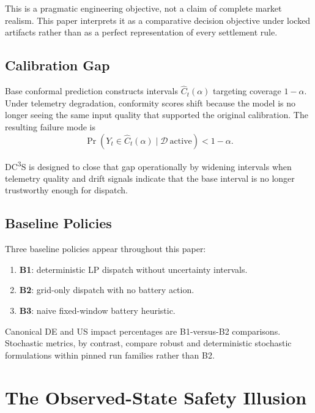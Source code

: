 \documentclass[11pt,a4paper]{article}
\begin{document}
This is a pragmatic engineering objective, not a claim of complete market realism. This paper interprets it as a comparative decision objective under locked artifacts rather than as a perfect representation of every settlement rule.

\subsection{Calibration Gap}

Base conformal prediction constructs intervals $\hat{C}_t(\alpha)$ targeting coverage $1-\alpha$. Under telemetry degradation, conformity scores shift because the model is no longer seeing the same input quality that supported the original calibration. The resulting failure mode is
\begin{equation}\label{eq:coverage_gap}
  \Pr\!\left(Y_t \in \hat{C}_t(\alpha) \mid \mathcal{D}\ \mathrm{active}\right) < 1-\alpha.
\end{equation}

DC\textsuperscript{3}S is designed to close that gap operationally by widening intervals when telemetry quality and drift signals indicate that the base interval is no longer trustworthy enough for dispatch.

\subsection{Baseline Policies}

Three baseline policies appear throughout this paper:
\begin{enumerate}[leftmargin=*,topsep=2pt,itemsep=1pt]
  \item \textbf{B1}: deterministic LP dispatch without uncertainty intervals.
  \item \textbf{B2}: grid-only dispatch with no battery action.
  \item \textbf{B3}: naive fixed-window battery heuristic.
\end{enumerate}

Canonical DE and US impact percentages are B1-versus-B2 comparisons. Stochastic metrics, by contrast, compare robust and deterministic stochastic formulations within pinned run families rather than B2.

\section{The Observed-State Safety Illusion}\label{sec:safety_illusion}
\end{document}
